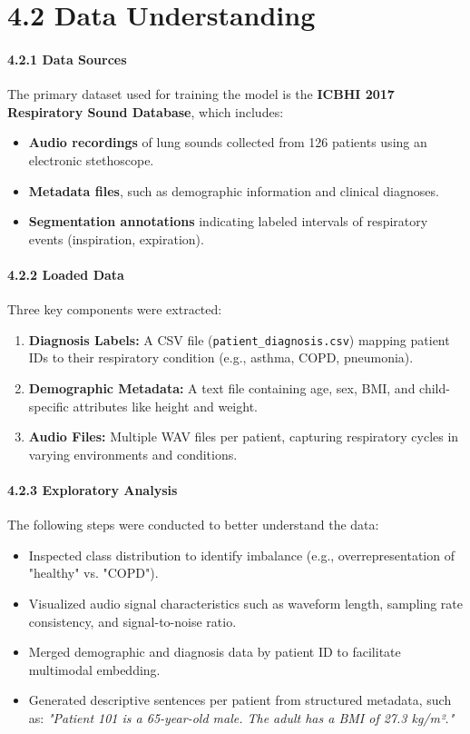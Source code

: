 \section*{4.2 Data Understanding}

\paragraph{4.2.1 Data Sources \\}
The primary dataset used for training the model is the \textbf{ICBHI 2017 Respiratory Sound Database}, which includes:
\begin{itemize}
    \item \textbf{Audio recordings} of lung sounds collected from 126 patients using an electronic stethoscope.
    \item \textbf{Metadata files}, such as demographic information and clinical diagnoses.
    \item \textbf{Segmentation annotations} indicating labeled intervals of respiratory events (inspiration, expiration).
\end{itemize}

\paragraph{4.2.2 Loaded Data\\}
Three key components were extracted:
\begin{enumerate}
    \item \textbf{Diagnosis Labels:} A CSV file (\texttt{patient\_diagnosis.csv}) mapping patient IDs to their respiratory condition (e.g., asthma, COPD, pneumonia).
    \item \textbf{Demographic Metadata:} A text file containing age, sex, BMI, and child-specific attributes like height and weight.
    \item \textbf{Audio Files:} Multiple WAV files per patient, capturing respiratory cycles in varying environments and conditions.
\end{enumerate}

\paragraph{4.2.3 Exploratory Analysis\\}
The following steps were conducted to better understand the data:
\begin{itemize}
    \item Inspected class distribution to identify imbalance (e.g., overrepresentation of "healthy" vs. "COPD").
    \item Visualized audio signal characteristics such as waveform length, sampling rate consistency, and signal-to-noise ratio.
    \item Merged demographic and diagnosis data by patient ID to facilitate multimodal embedding.
    \item Generated descriptive sentences per patient from structured metadata, such as:
    \textit{"Patient 101 is a 65-year-old male. The adult has a BMI of 27.3 kg/m²."}
\end{itemize}

